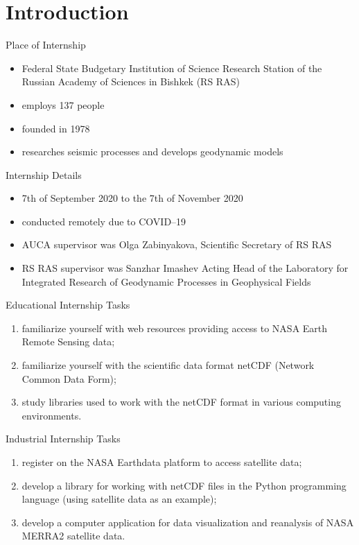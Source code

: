 \documentclass[../00_main.tex]{subfiles}
\begin{document}
\section{Introduction}

\begin{frame}{Place of Internship}
    \begin{itemize}
        \item Federal State Budgetary Institution of Science Research Station 
            of the Russian Academy of Sciences in Bishkek (RS RAS)
        \item employs 137 people
        \item founded in 1978
        \item researches seismic processes and develops geodynamic models
            \cite{rsras-website}
    \end{itemize}
\end{frame}

\begin{frame}{Internship Details}
    \begin{itemize}
        \item 7th of September 2020 to the 7th of November 2020 
        \item conducted remotely due to COVID--19
        \item AUCA supervisor was Olga Zabinyakova, Scientific Secretary 
            of RS RAS
        \item RS RAS supervisor was Sanzhar Imashev Acting Head of the 
            Laboratory for Integrated Research of Geodynamic Processes in 
            Geophysical Fields
    \end{itemize}
\end{frame}

\begin{frame}{Educational Internship Tasks}
\begin{enumerate}
    \item familiarize yourself with web resources providing access to NASA 
        Earth Remote Sensing data;
    \item familiarize yourself with the scientific data format netCDF (Network
        Common Data Form);
    \item study libraries used to work with the netCDF format in various 
        computing environments.
\end{enumerate}
\end{frame}

\begin{frame}{Industrial Internship Tasks}
\begin{enumerate}
    \item register on the NASA Earthdata platform to access satellite data;
    \item develop a library for working with netCDF files in the Python
        programming language (using satellite data as an example);
    \item develop a computer application for data visualization and reanalysis 
        of NASA MERRA2 satellite data.
\end{enumerate}
\end{frame}
\end{document}
